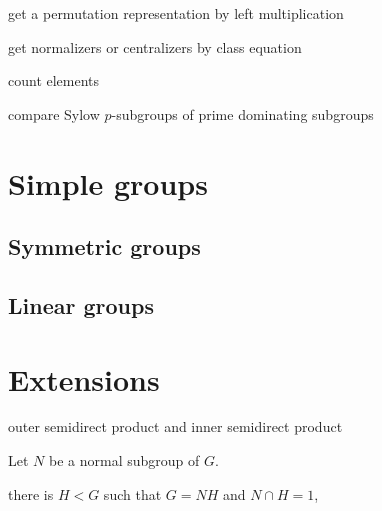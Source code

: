 \documentclass{../exp}
\begin{document}
\begin{cond}
\item get a permutation representation by left multiplication
\item get normalizers or centralizers by class equation
\end{cond}

\begin{cond}
\item count elements
\item compare Sylow $p$-subgroups of prime dominating subgroups
\end{cond}



\section{Simple groups}

\subsection{Symmetric groups}

\subsection{Linear groups}

\section{Extensions}

outer semidirect product and inner semidirect product
\begin{prop}
Let $N$ be a normal subgroup of $G$.
\begin{cond}
\item there is $H<G$ such that $G=NH$ and $N\cap H=1$,
\item 
\item
\end{cond}
\end{prop}
\end{document}
